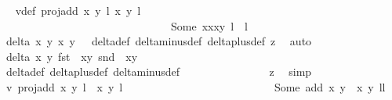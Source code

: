 \begin{isabellebody}
\ \isamarkupfalse%
\ v{}{\isacharunderscore}def{\isacharcolon}\ {\isachardoublequoteopen}proj{\isacharunderscore}add\ {\isacharparenleft}{\isacharparenleft}x{\isacharcomma}\ y{\isacharparenright}{\isacharcomma}\ l{\isacharparenright}\ {\isacharparenleft}{\isacharparenleft}x{\isacharprime}{\isacharcomma}\ y{\isacharprime}{\isacharparenright}{\isacharcomma}\ l{\isacharprime}{\isacharparenright}\ {\isacharequal}\ \isanewline
\ \ \ \ \ \ \ \ \ \ \ \ \ \ \ \ \ \ \ \ \ \ \ \ \ \ \ \ \ \ \ Some\ {\isacharparenleft}{\isacharparenleft}x{\isacharasterisk}x{\isacharprime}{\isacharcomma}x{\isacharasterisk}y{\isacharprime}{\isacharparenright}{\isacharcomma}\ l\ {\isacharplus}\ l{\isacharprime}{\isacharparenright}{\isachardoublequoteclose}\isanewline
\ \ \ \ \ \ \ \ \ \ \ \ \ \ \isamarkupfalse%
\ {\isacartoucheopen}delta\ x\ y\ x{\isacharprime}\ y{\isacharprime}\ {\isacharequal}\ {}{\isacartoucheclose}\ delta{\isacharunderscore}def\ delta{\isacharunderscore}minus{\isacharunderscore}def\ delta{\isacharunderscore}plus{\isacharunderscore}def\ z{}\ \isamarkupfalse%
\ auto\isanewline
\ \ \ \ \ \ \ \ \ \ \ \ \isamarkupfalse%
\ {\isachardoublequoteopen}delta\ x\ y\ {\isacharparenleft}fst\ {\isacharparenleft}{\isasymtau}\ {\isacharparenleft}x{\isacharprime}{\isacharcomma}y{\isacharprime}{\isacharparenright}{\isacharparenright}{\isacharparenright}\ {\isacharparenleft}snd\ {\isacharparenleft}{\isasymtau}\ {\isacharparenleft}x{\isacharprime}{\isacharcomma}y{\isacharprime}{\isacharparenright}{\isacharparenright}{\isacharparenright}\ {\isasymnoteq}\ {}{\isachardoublequoteclose}\isanewline
\ \ \ \ \ \ \ \ \ \ \ \ \ \ \isamarkupfalse%
\ delta{\isacharunderscore}def\ delta{\isacharunderscore}plus{\isacharunderscore}def\ delta{\isacharunderscore}minus{\isacharunderscore}def\isanewline
\ \ \ \ \ \ \ \ \ \ \ \ \ \ \isamarkupfalse%
\ z{}\ \isamarkupfalse%
\ simp\isanewline
\ \ \ \ \ \ \ \ \ \ \ \ \isamarkupfalse%
\ \isamarkupfalse%
\ v{}{\isacharcolon}\ {\isachardoublequoteopen}proj{\isacharunderscore}add\ {\isacharparenleft}{\isacharparenleft}x{\isacharcomma}\ y{\isacharparenright}{\isacharcomma}\ l{\isacharparenright}\ {\isacharparenleft}{\isasymtau}\ {\isacharparenleft}x{\isacharprime}{\isacharcomma}\ y{\isacharprime}{\isacharparenright}{\isacharcomma}\ l{\isacharprime}\ {\isacharplus}\ {}{\isacharparenright}\ {\isacharequal}\ \isanewline
\ \ \ \ \ \ \ \ \ \ \ \ \ \ \ \ \ \ \ \ \ \ \ Some\ {\isacharparenleft}add\ {\isacharparenleft}x{\isacharcomma}\ y{\isacharparenright}\ {\isacharparenleft}{\isasymtau}\ {\isacharparenleft}x{\isacharprime}{\isacharcomma}\ y{\isacharprime}{\isacharparenright}{\isacharparenright}{\isacharcomma}\ l{\isacharplus}l{\isacharprime}{\isacharplus}{}{\isacharparenright}{\isachardoublequoteclose}\isanewline

\end{isabellebody}
